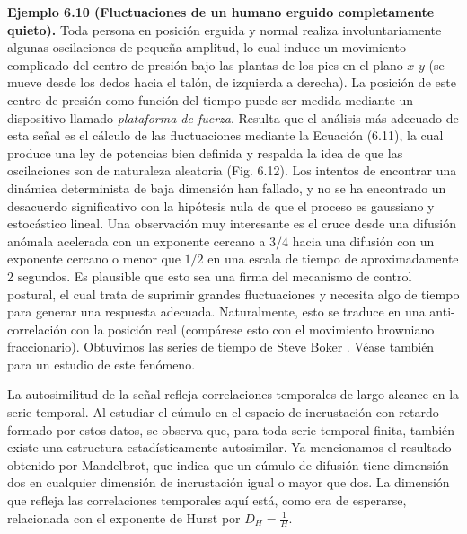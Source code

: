 \documentclass[10pt,a4paper]{book}
\begin{document}
\textbf{Ejemplo 6.10 (Fluctuaciones de un humano erguido completamente quieto).} Toda persona en posición erguida y normal realiza involuntariamente algunas oscilaciones de pequeña amplitud, lo cual induce un movimiento complicado del centro de presión bajo las plantas de los pies en el plano \(x\)-\(y\) (se mueve desde los dedos hacia el talón, de izquierda a derecha). La posición de este centro de presión como función del tiempo puede ser medida mediante un dispositivo llamado \textit{plataforma de fuerza}. Resulta que el análisis más adecuado de esta señal es el cálculo de las fluctuaciones mediante la Ecuación (6.11), la cual produce una ley de potencias bien definida y respalda la idea de que las oscilaciones son de naturaleza aleatoria (Fig. 6.12). Los intentos de encontrar una dinámica determinista de baja dimensión han fallado, y no se ha encontrado un desacuerdo significativo con la hipótesis nula de que el proceso es gaussiano y estocástico lineal. Una observación muy interesante es el cruce desde una difusión anómala acelerada con un exponente cercano a \(3/4\) hacia una difusión con un exponente cercano o menor que \(1/2\) en una escala de tiempo de aproximadamente 2 segundos. Es plausible que esto sea una firma del mecanismo de control postural, el cual trata de suprimir grandes fluctuaciones y necesita algo de tiempo para generar una respuesta adecuada. Naturalmente, esto se traduce en una anti-correlación con la posición real (compárese esto con el movimiento browniano fraccionario). Obtuvimos las series de tiempo de Steve Boker \cite[Apéndice B.9]{Bertenthal1996}. Véase también \cite{CollinsDeLuca1995} para un estudio de este fenómeno.

\newpage

La autosimilitud de la señal refleja correlaciones temporales de largo alcance en la serie temporal. Al estudiar el cúmulo en el espacio de incrustación con retardo formado por estos datos, se observa que, para toda serie temporal finita, también existe una estructura estadísticamente autosimilar. Ya mencionamos el resultado obtenido por Mandelbrot, que indica que un cúmulo de difusión tiene dimensión dos en cualquier dimensión de incrustación igual o mayor que dos. La dimensión que refleja las correlaciones temporales aquí está, como era de esperarse, relacionada con el exponente de Hurst por \( D_H = \frac{1}{H} \).

\bigskip
\end{document}
